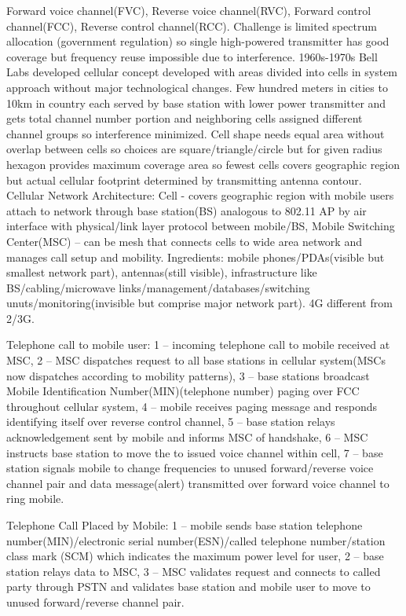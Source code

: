 \documentclass[9pt]{extarticle}
\begin{document}
\begin{multicols}{2}
Forward voice channel(FVC), Reverse voice channel(RVC), Forward control channel(FCC), Reverse control channel(RCC). Challenge is limited spectrum allocation (government regulation) so single high-powered transmitter has good coverage but frequency reuse impossible due to interference. 1960s-1970s Bell Labs developed cellular concept developed with areas divided into cells in system approach without major technological changes. Few hundred meters in cities to 10km in country each served by base station with lower power transmitter and gets total channel number portion and neighboring cells assigned different channel groups so interference minimized. Cell shape needs equal area without overlap between cells so choices are square/triangle/circle but for given radius hexagon provides maximum coverage area so fewest cells covers geographic region but actual cellular footprint determined by transmitting antenna contour. Cellular Network Architecture: Cell - covers geographic region with mobile users attach to network through base station(BS) analogous to 802.11 AP by air interface with physical/link layer protocol between mobile/BS, Mobile Switching Center(MSC) – can be mesh that connects cells to wide area network and manages call setup and mobility. Ingredients: mobile phones/PDAs(visible but smallest network part), antennas(still visible), infrastructure like BS/cabling/microwave links/management/databases/switching unuts/monitoring(invisible but comprise major network part). 4G different from 2/3G.

Telephone call to mobile user: 1 – incoming telephone call to mobile received at MSC, 2 – MSC dispatches request to all base stations in cellular system(MSCs now dispatches according to mobility patterns), 3 – base stations broadcast Mobile Identification Number(MIN)(telephone number) paging over FCC throughout cellular system, 4 – mobile receives paging message and responds identifying itself over reverse control channel, 5 – base station relays acknowledgement sent by mobile and informs MSC of handshake, 6 – MSC instructs base station to move the to issued voice channel within cell, 7 – base station signals mobile to change frequencies to unused forward/reverse voice channel pair and data message(alert) transmitted over forward voice channel to ring mobile.

Telephone Call Placed by Mobile: 1 – mobile sends base station telephone number(MIN)/electronic serial number(ESN)/called telephone number/station class mark (SCM) which indicates the
maximum power level for user, 2 – base station relays data to MSC, 3 – MSC validates request and connects to called party through PSTN and validates base station and mobile user to move to unused forward/reverse channel pair.


\end{multicols}
\end{document}
